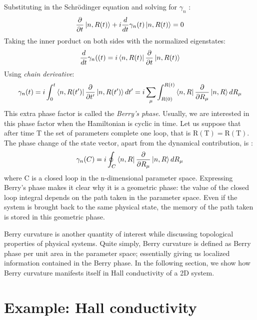 Substituting in the Schr{\"o}dinger equation and solving for $ \gamma _n $ :
\begin{equation}
    \dfrac{\partial}{\partial t}\ket{n,R(t)} + i\dfrac{d}{dt}\gamma _n(t)\ket{n,R(t)} = 0
\end{equation}
Taking the inner porduct on both sides with the normalized eigenstates:
\begin{equation}
    \dfrac{d}{dt}\gamma _n((t) = i\bra{n,R(t)}\dfrac{\partial}{\partial t}\ket{n,R(t)}
\end{equation}
Using \textit{chain derivative}:
\begin{equation}
    \gamma _n(t) = i\int^{t}_{0}\bra{n,R(t')}\dfrac{\partial}{\partial t'}\ket{n,R(t')}dt' = i\sum^{}_{\mu}\int^{R(t)}_{R(0)}\bra{n,R}\dfrac{\partial}{\partial R_\mu}\ket{n,R}dR_\mu
\end{equation}
This extra phase factor is called the \textit{Berry's phase}\cite{berry}. Usually, we are interested in this phase factor when the Hamiltonian is cyclic in time. Let us suppose that after time $ \mathrm{T} $ the set of parameters complete one loop, that is $ \mathrm{R(T)} = \mathrm{R(T)} $. The phase change of the state vector, apart from the dynamical contribution, is :
\begin{equation}
    \gamma _n(C) = i\oint_C \bra{n,R}\dfrac{\partial}{\partial R_{\mu}}\ket{n,R}dR_{\mu}
\end{equation}
where C is a closed loop in the n-dimensional parameter space. Expressing Berry's phase makes it clear why it is a geometric phase: the value of the closed loop integral depends on the path taken in the parameter space. Even if the system is brought back to the same physical state, the memory of the path taken is stored in this geometric phase.

Berry curvature is another quantity of interest while discussing topological properties of physical systems. Quite simply, Berry curvature is defined as Berry phase per unit area in the parameter space; essentially giving us localized information contained in the Berry phase. In the following section, we show how Berry curvature manifests itself in Hall conductivity of a 2D system. 

\section{Example: Hall conductivity}


